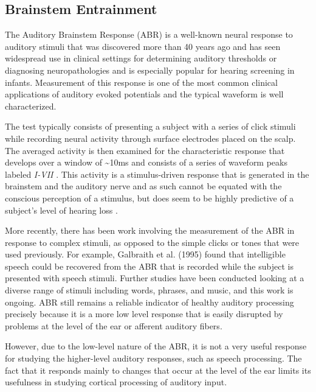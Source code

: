\documentclass[titlepage]{article}
\begin{document}
  \subsection{Brainstem Entrainment} \label{brainstemEntrainment}

    The Auditory Brainstem Response (ABR) is a well-known neural response to
    auditory stimuli that was discovered more than 40 years ago
    \cite{Jewett1971,Jewett1970} and has seen widespread use in clinical
    settings for determining auditory thresholds or diagnosing neuropathologies
    \cite{Skoe2010} and is especially popular for hearing screening in infants.
    Measurement of this response is one of the most common clinical applications
    of auditory evoked potentials and the typical waveform is well
    characterized.

    The test typically consists of presenting a subject with a series of click
    stimuli while recording neural activity through surface electrodes placed on
    the scalp. The averaged activity is then examined for the characteristic
    response that develops over a window of \textasciitilde 10ms and consists
    of a series of waveform peaks labeled \textit{I-VII}
    \cite{Sininger1993,Bhattacharyya2017}. This activity is a stimulus-driven
    response that is generated in the brainstem and the auditory nerve and as
    such cannot be equated with the conscious perception of a stimulus, but
    does seem to be highly predictive of a subject's level of hearing loss
    \cite{Sininger1993}.

    More recently, there has been work involving the measurement of the ABR in
    response to complex stimuli, as opposed to the simple clicks or tones that
    were used previously. For example, Galbraith et al. (1995)
    \cite{Galbraith1995} found that intelligible speech could be recovered from
    the ABR that is recorded while the subject is presented with speech stimuli.
    Further studies have been conducted looking at a diverse range of stimuli
    including words, phrases, and music, and this work is ongoing. ABR still 
    remains a reliable indicator of healthy auditory processing precisely 
    because it is a more low level response that is easily disrupted by problems
    at the level of the ear or afferent auditory fibers.

    However, due to the low-level nature of the ABR, it is not a very useful 
    response for studying the higher-level auditory responses, such as speech 
    processing. The fact that it responds mainly to changes that occur at the 
    level of the ear limits its usefulness in studying cortical processing of 
    auditory input.
\end{document}
